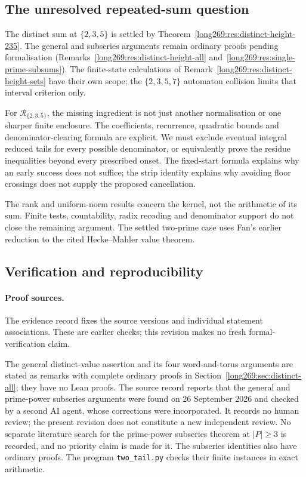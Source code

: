 \documentclass[11pt]{article}
\theoremstyle{remark}
\theoremstyle{plain}
\begin{document}
\subsection{The unresolved repeated-sum question}\label{long269:sec:remaining-question}

The distinct sum at $\{2,3,5\}$ is settled by
Theorem~\ref{long269:res:distinct-height-235}. The general and subseries
arguments remain ordinary proofs pending formalisation
(Remarks~\ref{long269:res:distinct-height-all}
and~\ref{long269:res:single-prime-subsums}). The finite-state calculations
of Remark~\ref{long269:res:distinct-height-sets} have their own scope;
the $\{2,3,5,7\}$ automaton collision limits that interval criterion only.

For $\mathcal R_{\{2,3,5\}}$, the missing ingredient is not just another
normalisation or one sharper finite enclosure. The coefficients, recurrence,
quadratic bounds and denominator-clearing formula are explicit. We must
exclude eventual integral reduced tails for every possible denominator,
or equivalently prove the residue inequalities beyond every prescribed
onset. The fixed-start formula explains why an early success does not
suffice; the strip identity explains why avoiding floor crossings does
not supply the proposed cancellation.

The rank and uniform-norm results concern the kernel, not the arithmetic
of its sum.  Finite tests, countability, radix recoding and denominator
support do not close the remaining argument.  The settled two-prime case
uses Fan's earlier reduction to the cited Hecke--Mahler value theorem.

\subsection*{Verification and reproducibility}\label{long269:sec:proof-sources}
\evidenceparagraph{\evidencerecordurl}

\paragraph{Proof sources.}
The evidence record fixes the source versions and individual statement
associations. These are earlier checks; this revision makes no fresh
formal-verification claim.

The general distinct-value assertion and its four word-and-torus
arguments are stated as remarks with complete ordinary proofs in
Section~\ref{long269:sec:distinct-all}; they have no Lean proofs. The source record reports that the general and
prime-power subseries arguments were found on 26 September 2026 and checked
by a second AI agent, whose corrections were incorporated. It records
no human review; the present revision does not constitute a new independent
review. No separate literature search for the prime-power subseries theorem
at $|P|\ge3$ is recorded, and no priority claim is made for it. The
subseries identities also have ordinary proofs. The program
\texttt{two\_tail.py} checks their finite instances in exact arithmetic.
\end{document}
